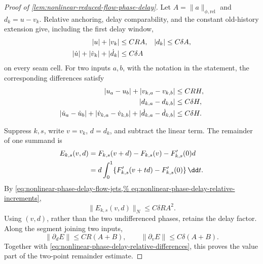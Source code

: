 \begin{proof}[Proof of
\cref{lem:nonlinear-reduced-flow-phase-delay}]
Let \(A=\|a\|_{\phi,\mathrm{rel}}\) and
\(d_k=u-v_k\).  Relative anchoring, delay comparability, and the constant
old-history extension give, including the first delay window,
\begin{align}
 |u|+|v_k|&\le CR A,&
 |d_k|&\le C\delta A,\notag\\
 |\dot u|+|\dot v_k|+|\dot d_k|
 &\le C\delta A                                  \label{eq:nonlinear-phase-delay-relative-increments}
\end{align}
on every seam cell.  For two inputs \(a,b\), with the notation in the
statement, the corresponding differences satisfy
\begin{align}
 |u_a-u_b|+|v_{k,a}-v_{k,b}|&\le CRH,\notag\\
 |d_{k,a}-d_{k,b}|&\le C\delta H,\notag\\
 |\dot u_a-\dot u_b|+|\dot v_{k,a}-\dot v_{k,b}|
       +|\dot d_{k,a}-\dot d_{k,b}|
 &\le C\delta H.                                  \label{eq:nonlinear-phase-delay-relative-differences}
\end{align}

Suppress \(k,s\), write \(v=v_k\), \(d=d_k\), and subtract the
linear term.  The remainder of one summand is
\begin{align}
 E_{k,s}(v,d)
 &=F_{k,s}(v+d)-F_{k,s}(v)-F_{k,s}'(0)d\notag\\
 &=d\int_0^1
   \{F_{k,s}'(v+td)-F_{k,s}'(0)\}\,\dd t.          \label{eq:nonlinear-phase-delay-summand-remainder}
\end{align}
By
\cref{eq:nonlinear-phase-delay-flow-jets,%
eq:nonlinear-phase-delay-relative-increments},
\begin{equation}
 \|E_{k,s}(v,d)\|_N\le C\delta R A^2.              \label{eq:nonlinear-phase-delay-summand-value}
\end{equation}
Using \((v,d)\), rather than the two undifferenced phases, retains the
delay factor.  Along the segment joining two inputs,
\[
 \|\partial_dE\|\le CR(A+B),\qquad
 \|\partial_vE\|\le C\delta(A+B).
\]
Together with
\cref{eq:nonlinear-phase-delay-relative-differences}, this proves the
value part of the two-point remainder estimate.


\end{proof}

